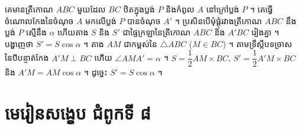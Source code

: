 \begin{pro}
គេមានត្រីកោណ $ABC$ មួយដែល $BC$ ឋិតក្នុងប្លង់ $P$ និងកំពូល $A$ នៅក្រៅប្លង់ $P$ ។ គេធ្វើចំណោលកែងនៃចំណុច $A$ មកលើប្លង់ $P$ បានចំណុច $A'$ ។ ប្រសិនបើមុំផ្គុំរវាងត្រីកោណ $ABC$ នឹងប្លង់ $P$ ស្មើនឹង $\alpha$ ហើយតាង $S$ និង $S'$ ជាផ្ទៃក្រឡានៃត្រីកោណ $ABC$ និង $A'BC$ រៀងគ្នា ។ បង្ហាញថា $S' = S\cos\alpha$ ។
\ans
តាង $AM$ ជាកម្ពស់នៃ $\triangle ABC$ ($M \in BC$) ។ តាមទ្រឹស្ដីបទច្រាសនៃបីបន្ទាត់កែង $A'M \perp BC$ ហើយ $\angle AMA' = \alpha$ ។ $S = \dfrac{1}{2}AM\times BC$, $S' = \dfrac{1}{2}A'M\times BC$ និង $A'M = AM\cos\alpha$ ។ ដូច្នេះ $S' = S\cos\alpha$ ។
\end{pro}

\section*{មេរៀនសង្ខេប ជំពូកទី ៨}
